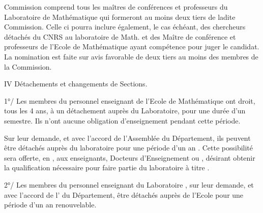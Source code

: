 
 Commission comprend tous les maîtres de conférences et professeurs du Laboratoire de Mathématique qui formeront au moins deux tiers de ladite Commission. Celle ci pourra inclure également, le cas échéant, des chercheurs détachés du CNRS au laboratoire de Math. et des Maître de conférence et professeurs de l'Ecole de Mathématique ayant compétence pour juger le candidat. La nomination est faite sur avis favorable de deux tiers au moins des membres de la Commission.

IV Détachements et changements de Sections.

1°/ Les membres du personnel enseignant de l'Ecole de Mathématique ont droit, tous les 4 ans, à un détachement auprès du Laboratoire, pour une durée d'un semestre. Ils n'ont aucune obligation d'enseignement pendant cette période.

Sur leur demande, et avec l'accord de l'Assemblée du Département, ils peuvent être détachés auprès du laboratoire pour une période d'un an . Cette possibilité sera offerte, en , aux enseignants, Docteurs d'Enseignement ou , désirant obtenir la qualification nécessaire pour faire partie du laboratoire à titre .

2°/ Les membres du personnel enseignant du Laboratoire , sur leur demande, et avec l'accord de l' du Département, être détachés auprès de l'Ecole pour une période d'un an renouvelable.
